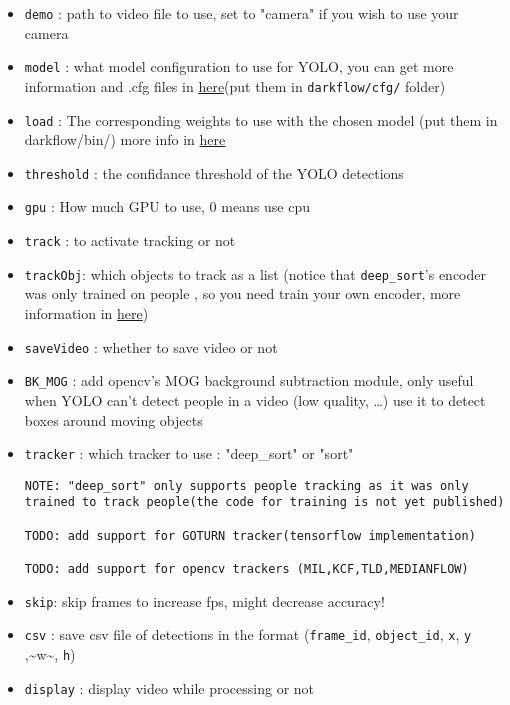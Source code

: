\documentclass[letterpaper, 9pt, onecolumn, twoside, technote, final]{IEEEtran}
\begin{document}
\begin{itemize}
\item \texttt{demo} : path to video file to use, set to "camera" if you wish to
use your camera

\item \texttt{model} : what model configuration to use for YOLO, you can get more
 information and .cfg files in \href{http://pjreddie.com/darknet/yolo/}{here}(put them in \texttt{darkflow/cfg/}
folder)

\item \texttt{load} : The corresponding weights to use with the chosen model (put
them in darkflow/bin/) more info in \href{http://pjreddie.com/darknet/yolo/}{here}

\item \texttt{threshold} : the confidance threshold of the YOLO detections

\item \texttt{gpu} : How much GPU to use, 0 means use cpu

\item \texttt{track} : to activate tracking or not

\item \texttt{trackObj}: which objects to track as a list (notice that
\texttt{deep\_sort}'s encoder was only trained on people , so you need train
your own encoder, more information in \href{https://github.com/nwojke/deep\_sort/issues/7}{here})

\item \texttt{saveVideo} : whether to save video or not

\item \texttt{BK\_MOG} : add opencv's MOG background subtraction module, only
useful when YOLO can't detect people in a video (low quality, \ldots{})
use it to detect boxes around moving objects

\item \texttt{tracker} : which tracker to use : "deep\_sort" or "sort"

\begin{verbatim}
NOTE: "deep_sort" only supports people tracking as it was only trained to track people(the code for training is not yet published)

TODO: add support for GOTURN tracker(tensorflow implementation)

TODO: add support for opencv trackers (MIL,KCF,TLD,MEDIANFLOW)
\end{verbatim}

\item \texttt{skip}: skip frames to increase fps, might decrease accuracy!

\item \texttt{csv} : save csv file of detections in the format
(\texttt{frame\_id}, \texttt{object\_id}, \texttt{x}, \texttt{y} ,\textasciitilde{}w\textasciitilde{}, \texttt{h})

\item \texttt{display} : display video while processing or not
\end{itemize}
\end{document}
